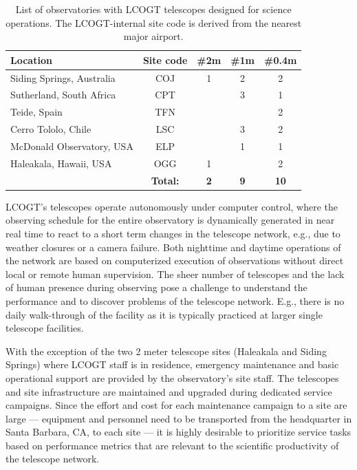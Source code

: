 \documentclass[draft]{spieman}
\begin{document}
\begin{table}[h]
\centering
\begin{tabular} {|l|c|ccc|} \hline
Location                  & Site code & \#2m & \#1m & \#0.4m \\ \hline
Siding Springs, Australia & COJ & 1 & 2 & 2  \\
Sutherland, South Africa  & CPT &   & 3 & 1 \\
Teide, Spain              & TFN &   &   & 2 \\
Cerro Tololo, Chile       & LSC &   & 3 & 2 \\
McDonald Observatory, USA & ELP &   & 1 & 1\\
Haleakala, Hawaii, USA     & OGG & 1 &   & 2 \\\hline
                       &   \bf Total:  & \bf 2 & \bf 9 & \bf 10 \\ \hline
\end{tabular}
\vspace{1ex}
\caption{\label{tab_sites} List of observatories with LCOGT telescopes designed for science
operations. The LCOGT-internal site code is derived from the nearest major airport. }
\end{table}


LCOGT's telescopes operate autonomously under computer control, where the observing schedule for the
entire observatory is dynamically generated in near real time to react to a short term changes in
the telescope network\cite{saunders2014}, e.g., due to weather closures or a camera failure. Both
nighttime and daytime operations of the network are based on computerized execution of
observations without direct local or remote human supervision. The sheer number of telescopes and
the lack of human presence during observing pose a challenge to understand the performance and to
discover problems of the telescope network. E.g., there is no daily walk-through of the facility as
it is typically practiced at larger single telescope facilities.

With the exception of the two 2 meter telescope sites (Haleakala and Siding Springs) where LCOGT staff
is in residence, emergency maintenance and basic operational support are provided by the
observatory's site staff. The telescopes and site infrastructure are maintained and upgraded during
dedicated service campaigns. Since the effort and cost for each maintenance campaign to a site are
large --- equipment and personnel need to be transported from the headquarter in Santa Barbara, CA,
to each site --- it is highly desirable to prioritize service tasks based on performance metrics
that are relevant to the scientific productivity of the telescope network.
\end{document}
